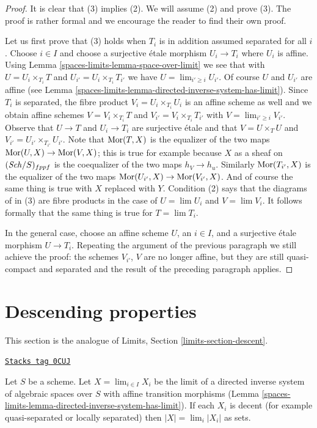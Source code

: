 \begin{proof}
It is clear that (3) implies (2). We will assume (2) and prove (3).
The proof is rather formal and we encourage the reader to find their
own proof.

\medskip\noindent
Let us first prove that (3) holds
when $T_i$ is in addition assumed separated for all $i$.
Choose $i \in I$ and choose a surjective \'etale morphism $U_i \to T_i$
where $U_i$ is affine. Using Lemma \ref{spaces-limits-lemma-space-over-limit}
we see that with $U = U_i \times_{T_i} T$ and
$U_{i'} = U_i \times_{T_i} T_{i'}$ we have $U = \lim_{i' \geq i} U_{i'}$.
Of course $U$ and $U_{i'}$ are affine (see
Lemma \ref{spaces-limits-lemma-directed-inverse-system-has-limit}).
Since $T_i$ is separated, the fibre product $V_i = U_i \times_{T_i} U_i$
is an affine scheme as well and we obtain affine schemes
$V = V_i \times_{T_i} T$ and
$V_{i'} = V_i \times_{T_i} T_{i'}$ with $V = \lim_{i' \geq i} V_{i'}$.
Observe that $U \to T$ and $U_i \to T_i$ are surjective \'etale and
that $V = U \times_T U$ and $V_{i'} = U_{i'} \times_{T_{i'}} U_{i'}$.
Note that $\operatorname{Mor}(T, X)$ is the equalizer of the two maps
$\operatorname{Mor}(U, X) \to \operatorname{Mor}(V, X)$; this is true for example because
$X$ as a sheaf on $(\mathit{Sch}/S)_{fppf}$ is the coequalizer
of the two maps $h_V \to h_u$. Similarly
$\operatorname{Mor}(T_{i'}, X)$ is the equalizer of the
two maps $\operatorname{Mor}(U_{i'}, X) \to \operatorname{Mor}(V_{i'}, X)$.
And of course the same thing is true with $X$ replaced with $Y$.
Condition (2) says that the diagrams of in (3) are fibre products
in the case of $U = \lim U_i$ and $V = \lim V_i$.
It follows formally that the same thing is true for $T = \lim T_i$.

\medskip\noindent
In the general case, choose an affine scheme $U$, an $i \in I$,
and a surjective \'etale morphism $U \to T_i$. Repeating the
argument of the previous paragraph we still achieve the proof:
the schemes $V_{i'}$, $V$ are no longer affine, but they are
still quasi-compact and
separated and the result of the preceding paragraph applies.
\end{proof}

\section{Descending properties}
\label{spaces-limits-section-descent}
This section is the analogue of Limits, Section \ref{limits-section-descent}.

\begin{lemma}
\label{spaces-limits-lemma-inverse-limit-sets}
\href{https://stacks.math.columbia.edu/tag/0CUJ}{\texttt{Stacks tag 0CUJ}}

Let $S$ be a scheme. Let $X = \lim_{i \in I} X_i$ be the limit of a directed
inverse system of algebraic spaces over $S$ with affine transition morphisms
(Lemma \ref{spaces-limits-lemma-directed-inverse-system-has-limit}). If each $X_i$
is decent (for example quasi-separated or locally separated)
then $|X| = \lim_i |X_i|$ as sets.
\end{lemma}

